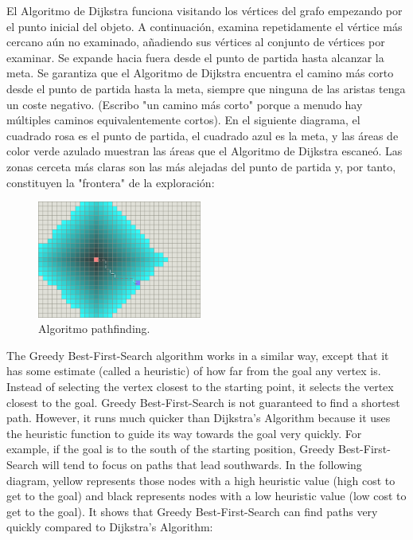 \documentclass[reprint,amsmath,amssymb,aps]{revtex4-2}
\begin{document}
El Algoritmo de Dijkstra funciona visitando los vértices del grafo empezando por el punto inicial del objeto. A continuación, examina repetidamente el vértice más cercano aún no examinado, añadiendo sus vértices al conjunto de vértices por examinar. Se expande hacia fuera desde el punto de partida hasta alcanzar la meta. Se garantiza que el Algoritmo de Dijkstra encuentra el camino más corto desde el punto de partida hasta la meta, siempre que ninguna de las aristas tenga un coste negativo. (Escribo "un camino más corto" porque a menudo hay múltiples caminos equivalentemente cortos). En el siguiente diagrama, el cuadrado rosa es el punto de partida, el cuadrado azul es la meta, y las áreas de color verde azulado muestran las áreas que el Algoritmo de Dijkstra escaneó. Las zonas cerceta más claras son las más alejadas del punto de partida y, por tanto, constituyen la "frontera" de la exploración:

\begin{figure}[H]
 	\centering
 	\includegraphics[width=0.48\textwidth]{dijkstra.png}
 	\caption{Algoritmo pathfinding.}
 	\label{dijkstra}
\end{figure}

The Greedy Best-First-Search algorithm works in a similar way, except that it has some estimate (called a heuristic) of how far from the goal any vertex is. Instead of selecting the vertex closest to the starting point, it selects the vertex closest to the goal. Greedy Best-First-Search is not guaranteed to find a shortest path. However, it runs much quicker than Dijkstra’s Algorithm because it uses the heuristic function to guide its way towards the goal very quickly. For example, if the goal is to the south of the starting position, Greedy Best-First-Search will tend to focus on paths that lead southwards. In the following diagram, yellow represents those nodes with a high heuristic value (high cost to get to the goal) and black represents nodes with a low heuristic value (low cost to get to the goal). It shows that Greedy Best-First-Search can find paths very quickly compared to Dijkstra’s Algorithm:
\end{document}
